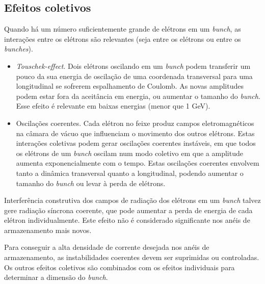 \subsection{Efeitos coletivos}
Quando há um número suficientemente grande de elétrons em um \textit{bunch}, as interações entre os elétrons são relevantes (seja entre os elétrons ou entre os \textit{bunches}). 
	
\begin{itemize}
	\item \textit{Touschek-effect}. Dois elétrons oscilando em um \textit{bunch} podem transferir um pouco da sua energia de oscilação de uma coordenada transversal para uma longitudinal se sofrerem espalhamento de Coulomb. As novas amplitudes podem estar fora da aceitância em energia, ou aumentar o tamanho do \textit{bunch}. Esse efeito é relevante em baixas energias (menor que 1 GeV).
    \item Oscilações coerentes. Cada elétron no feixe produz campos eletromagnéticos na câmara de vácuo 	que influenciam o movimento dos outros elétrons. Estas interações coletivas podem gerar oscilações 		coerentes instáveis, em que todos os elétrons de um \textit{bunch} oscilam num modo coletivo em que 	a amplitude aumenta exponencialmente com o tempo. Estas oscilações coerentes envolvem tanto a 			dinâmica transversal quanto a longitudinal, podendo aumentar o tamanho do \textit{bunch} ou levar à 	perda de elétrons.
\end{itemize}
	
Interferência construtiva dos campos de radiação dos elétrons em um \textit{bunch} talvez gere radiação síncrona coerente, que pode aumentar a perda de energia de cada elétron individualmente. Este efeito não é considerado significante nos anéis de armazenamento mais novos.
	
Para conseguir a alta densidade de corrente desejada nos anéis de armazenamento, as instabilidades coerentes devem ser suprimidas ou controladas. Os outros efeitos coletivos são combinados com os efeitos individuais para determinar a dimensão do \textit{bunch}.